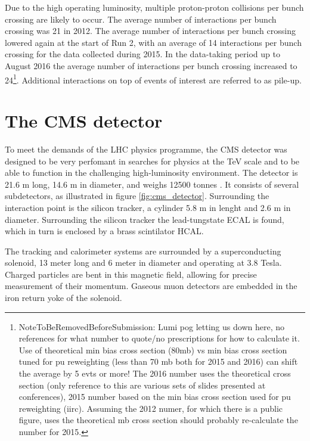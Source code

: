Due to the high operating luminosity, multiple proton-proton collisions per 
bunch crossing are likely to occur. The average number of interactions
per bunch crossing was 21 in 2012\cite{cms-lumi-public}. The average number of
interactions per bunch crossing lowered again at the start of Run 2, with
an average of 14 interactions per bunch crossing for the data collected
during 2015. In the data-taking period up to August 2016 the average number of interactions
per bunch crossing increased to 24\footnote{NoteToBeRemovedBeforeSubmission: Lumi pog letting us down 
here, no references for what number to quote/no prescriptions for how to calculate it. Use of theoretical
min bias cross section (80mb) vs min bias cross section tuned for pu reweighting (less than 70 mb both for
2015 and 2016) can shift the average by 5 evts or more! The 2016 number uses the theoretical
cross section (only reference to this are various sets of slides presented at conferences), 2015
number based on the min bias cross section used for pu reweighting (iirc). Assuming the 2012 numer,
for which there is a public figure, uses the theoretical mb cross section should probably re-calculate the
number for 2015.}. Additional 
interactions on top of events of interest are referred to as pile-up.

\section{The \acs{CMS} detector}
\label{sec:CMSLHC_CMS}
To meet the demands of the \ac{LHC} physics programme, the
 \ac{CMS} detector was designed to be very perfomant in searches
for physics at the TeV scale and to be able to 
function in the challenging high-luminosity environment.
The detector is 21.6 m long, 14.6 m in diameter, and weighs
12500 tonnes \cite{cms-jinst}. It consists of several subdetectors, as illustrated
in figure \ref{fig:cms_detector}. Surrounding the interaction
point is the silicon tracker, a cylinder 5.8 m in lenght and 2.6 m in 
diameter. Surrounding the silicon tracker
the lead-tungstate \ac{ECAL} is found, which in turn is enclosed
by a brass scintilator \ac{HCAL}. 

The tracking and calorimeter systems are surrounded by a superconducting
solenoid, 13 meter long and 6 meter in diameter and operating at 3.8 Tesla.
Charged particles are bent in this magnetic field, allowing for precise 
measurement of their momentum. Gaseous muon detectors are embedded in the 
iron return yoke of the solenoid.


